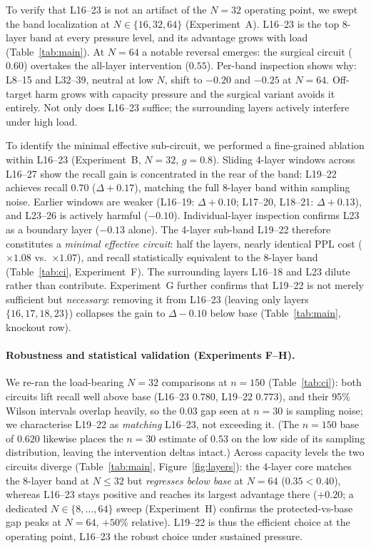 \documentclass{article}
\begin{document}
To verify that L16--23 is not an artifact of the $N{=}32$ operating point, we
swept the band localization at $N\in\{16,32,64\}$ (Experiment~A). L16--23 is the
top 8-layer band at every pressure level, and its advantage grows with load
(Table~\ref{tab:main}). At $N{=}64$ a notable reversal emerges: the surgical
circuit ($0.60$) overtakes the all-layer intervention ($0.55$). Per-band
inspection shows why: L8--15 and L32--39, neutral at low $N$, shift to $-0.20$
and $-0.25$ at $N{=}64$. Off-target harm grows with capacity pressure and the
surgical variant avoids it entirely. Not only does L16--23 suffice; the
surrounding layers actively interfere under high load.

To identify the minimal effective sub-circuit, we performed a fine-grained
ablation within L16--23 (Experiment~B, $N{=}32$, $g{=}0.8$). Sliding 4-layer
windows across L16--27 show the recall gain is concentrated in the rear of the
band: L19--22 achieves recall $0.70$ ($\Delta{+}0.17$), matching the full 8-layer band
within sampling noise. Earlier windows are weaker
(L16--19: $\Delta{+}0.10$; L17--20, L18--21: $\Delta{+}0.13$), and L23--26 is
actively harmful ($-0.10$). Individual-layer inspection confirms L23 as a boundary
layer ($-0.13$ alone). The 4-layer sub-band L19--22 therefore constitutes a
\emph{minimal effective circuit}: half the layers, nearly identical PPL cost
($\times 1.08$ vs.\ $\times 1.07$), and recall statistically equivalent to the
8-layer band (Table~\ref{tab:ci}, Experiment~F). The surrounding layers L16--18
and L23 dilute rather than contribute. Experiment~G further confirms that L19--22
is not merely sufficient but \emph{necessary}: removing it from L16--23 (leaving
only layers~$\{16,17,18,23\}$) collapses the gain to $\Delta{-}0.10$ below base
(Table~\ref{tab:main}, knockout row).

\paragraph{Robustness and statistical validation (Experiments F--H).}
We re-ran the load-bearing $N{=}32$ comparisons at $n{=}150$ (Table~\ref{tab:ci}):
both circuits lift recall well above base (L16--23 $0.780$, L19--22 $0.773$), and
their 95\% Wilson intervals overlap heavily, so the $0.03$ gap seen at $n{=}30$ is
sampling noise; we characterise L19--22 as \emph{matching} L16--23, not exceeding
it. (The $n{=}150$ base of $0.620$ likewise places the $n{=}30$ estimate of $0.53$
on the low side of its sampling distribution, leaving the intervention deltas
intact.) Across capacity levels the two circuits diverge (Table~\ref{tab:main},
Figure~\ref{fig:layers}): the 4-layer core matches the 8-layer band at $N{\le}32$
but \emph{regresses below base} at $N{=}64$ ($0.35<0.40$), whereas L16--23 stays
positive and reaches its largest advantage there ($+0.20$; a dedicated
$N\in\{8,\dots,64\}$ sweep (Experiment~H) confirms the protected-vs-base gap peaks
at $N{=}64$, $+50\%$ relative). L19--22 is thus the efficient choice at the operating point,
L16--23 the robust choice under sustained pressure.
\end{document}
